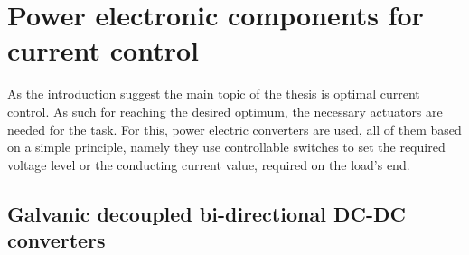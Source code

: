 {%

\section{Power electronic components for current control}\label{BASICCSR:sec:PowerGeneral}

As the introduction suggest the main topic of the thesis is optimal current control. As such for reaching the desired optimum, the necessary actuators are needed for the task. For this, power electric converters are used, all of them based on a simple principle, namely they use controllable switches to set the required voltage level or the conducting current value, required on the load's end.


\subsection{Galvanic decoupled bi-directional DC-DC converters}\label{BASICCSR:sec:DCDC}

}
